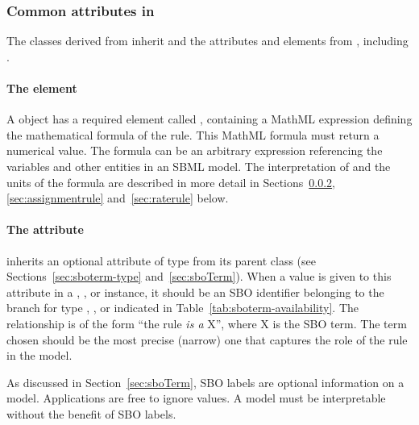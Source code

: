 \subsubsection{Common attributes in }
\label{sec:rule-math}\label{sec:rule-fields}\label{sec:rule-sboterm}

The classes derived from \Rule inherit  and
  the attributes and elements from \SBase, including
.


\paragraph{The  element}

A \Rule object has a required element called ,
containing a MathML expression defining the mathematical formula
of the rule.  This MathML formula must return a numerical value.
The formula can be an arbitrary expression referencing the
variables and other entities in an SBML model.  The interpretation
of  and the units of the formula are described in more
detail in Sections~\ref{sec:algebraicrule},
\ref{sec:assignmentrule} and~\ref{sec:raterule} below.


\paragraph{The  attribute}

\Rule inherits an optional 
attribute of type  from its parent
class \SBase (see Sections~\ref{sec:sboterm-type}
and~\ref{sec:sboTerm}).  When a value is given to this
attribute in a   \AlgebraicRule, \AssignmentRule, or
\RateRule instance, it should be an
SBO identifier belonging to the branch for type  \AlgebraicRule, \AssignmentRule, or
\RateRule indicated in Table~\ref{tab:sboterm-availability}.  The relationship is
of the form ``the rule \emph{is a} X'', where X is
the SBO term.  The term chosen should be the most precise (narrow)
one that captures the role of the rule in the model.

As discussed in Section~\ref{sec:sboTerm}, SBO labels are optional
information on a model.  Applications are free to ignore
 values.  A model must be interpretable without the
benefit of SBO labels.


\subsubsection{}
\label{sec:algebraicrule}

